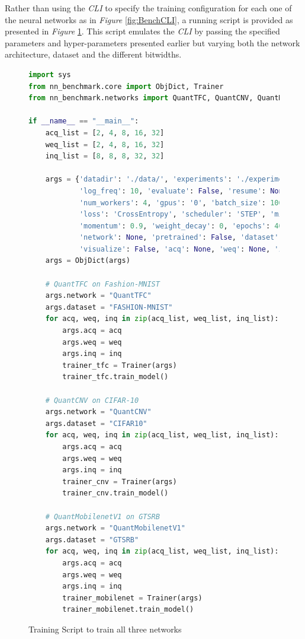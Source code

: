 Rather than using the \emph{CLI} to specify the training configuration for each one of the neural networks as in \emph{Figure} \ref{fig:BenchCLI}, a running script is provided as presented in \emph{Figure} \ref{fig:TrainingScript}. This script emulates the \emph{CLI} by passing the specified parameters and hyper-parameters presented earlier but varying both the network architecture, dataset and the different bitwidths.

\begin{figure}[htbp]
\centering
\begin{lstlisting}[language=Python]
import sys
from nn_benchmark.core import ObjDict, Trainer
from nn_benchmark.networks import QuantTFC, QuantCNV, QuantMobilenetV1

if __name__ == "__main__":
    acq_list = [2, 4, 8, 16, 32]
    weq_list = [2, 4, 8, 16, 32]
    inq_list = [8, 8, 8, 32, 32]

    args = {'datadir': './data/', 'experiments': './experiments', 'dry_run': False,
            'log_freq': 10, 'evaluate': False, 'resume': None, 'detect_nan': False,
            'num_workers': 4, 'gpus': '0', 'batch_size': 100, 'lr': 0.01, 'optim': 'ADAM',
            'loss': 'CrossEntropy', 'scheduler': 'STEP', 'milestones': '34,37',
            'momentum': 0.9, 'weight_decay': 0, 'epochs': 40, 'random_seed': 1,
            'network': None, 'pretrained': False, 'dataset': None,
            'visualize': False, 'acq': None, 'weq': None, 'inq': None, 'onnx': False}
    args = ObjDict(args)

    # QuantTFC on Fashion-MNIST
    args.network = "QuantTFC"
    args.dataset = "FASHION-MNIST"
    for acq, weq, inq in zip(acq_list, weq_list, inq_list):
        args.acq = acq
        args.weq = weq
        args.inq = inq
        trainer_tfc = Trainer(args)
        trainer_tfc.train_model()

    # QuantCNV on CIFAR-10
    args.network = "QuantCNV"
    args.dataset = "CIFAR10"
    for acq, weq, inq in zip(acq_list, weq_list, inq_list):
        args.acq = acq
        args.weq = weq
        args.inq = inq
        trainer_cnv = Trainer(args)
        trainer_cnv.train_model()

    # QuantMobilenetV1 on GTSRB
    args.network = "QuantMobilenetV1"
    args.dataset = "GTSRB"
    for acq, weq, inq in zip(acq_list, weq_list, inq_list):
        args.acq = acq
        args.weq = weq
        args.inq = inq
        trainer_mobilenet = Trainer(args)
        trainer_mobilenet.train_model()
\end{lstlisting}
\caption[Training Script]{Training Script to train all three networks}
	\label{fig:TrainingScript}
\end{figure}

